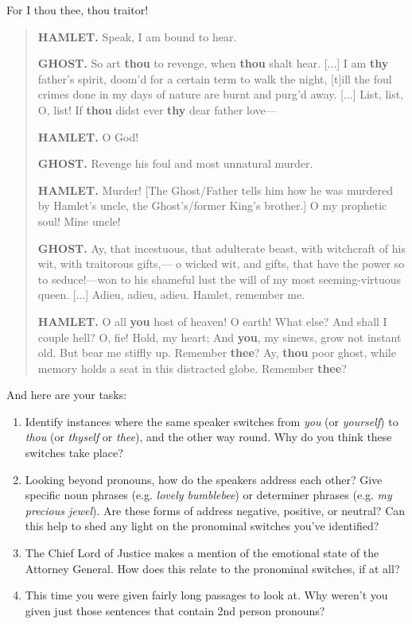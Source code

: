 \begin{exercises}{For I thou thee, thou traitor!}
\begin{quote}
    \textbf{HAMLET.} Speak, I am bound to hear.

    \textbf{GHOST.} So art \textbf{thou} to revenge, when \textbf{thou} shalt hear. [...] I am \textbf{thy} father's spirit, doom'd for a certain term to walk the night, [t]ill the foul crimes done in my days of nature are burnt and purg'd away. [...] List, list, O, list! If \textbf{thou} didst ever \textbf{thy} dear father love—
    
    \textbf{HAMLET.} O God!

    \textbf{GHOST.} Revenge his foul and most unnatural murder.
    
    \textbf{HAMLET.} Murder! [The Ghost/Father tells him how he was murdered by Hamlet's uncle, the Ghost's/former King's brother.] O my prophetic soul! Mine uncle!
    
    \textbf{GHOST.} Ay, that incestuous, that adulterate beast, with witchcraft of his wit, with traitorous gifts,— o wicked wit, and gifts, that have the power so to seduce!—won to his shameful lust the will of my most seeming-virtuous queen. [...] Adieu, adieu, adieu. Hamlet, remember me.
    
    \textbf{HAMLET.} O all \textbf{you} host of heaven! O earth! What else? And shall I couple hell? O, fie! Hold, my heart; And \textbf{you}, my sinews, grow not instant old. But bear me stiffly up. Remember \textbf{thee}? Ay, \textbf{thou} poor ghost, while memory holds a seat in this distracted globe. Remember \textbf{thee}?
\end{quote}

\noindent And here are your tasks:

\begin{enumerate}
\item Identify instances where the same speaker switches from \textit{you} (or \textit{yourself}) to \textit{thou} (or \textit{thyself} or \textit{thee}), and the other way round. Why do you think these switches take place?
\item Looking beyond pronouns, how do the speakers address each other? Give specific noun phrases (e.g. \textit{lovely bumblebee}) or determiner phrases (e.g. \textit{my precious jewel}). Are these forms of address negative, positive, or neutral? Can this help to shed any light on the pronominal switches you've identified?
\item The Chief Lord of Justice makes a mention of the emotional state of the Attorney General. How does this relate to the pronominal switches, if at all?
\item This time you were given fairly long passages to look at. Why weren't you given just those sentences that contain 2nd person pronouns?
\end{enumerate}

\end{exercises}

